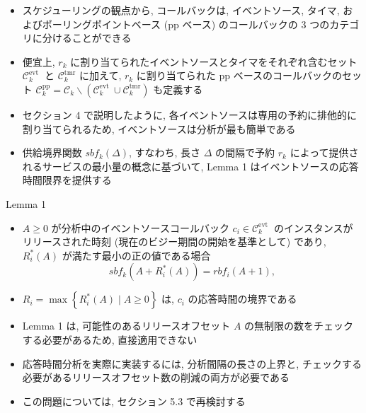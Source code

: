 \begin{frame}{}
    \begin{itemize}
        \item スケジューリングの観点から, コールバックは, イベントソース, タイマ, およびポーリングポイントベース (pp ベース) のコールバックの 3 つのカテゴリに分けることができる
\item 便宜上, $r_{k}$ に割り当てられたイベントソースとタイマをそれぞれ含むセット $\mathcal{C}_{k}^{\text {evt }}$ と $\mathcal{C}_{k}^{\mathrm{tmr}}$ に加えて, $r_{k}$ に割り当てられた pp ベースのコールバックのセット $\mathcal{C}_{k}^{\mathrm{pp}}=\mathcal{C}_{k} \backslash\left(\mathcal{C}_{k}^{\text {evt }} \cup \mathcal{C}_{k}^{\mathrm{tmr}}\right)$ も定義する
\item セクション 4 で説明したように, 各イベントソースは専用の予約に排他的に割り当てられるため, イベントソースは分析が最も簡単である
\item 供給境界関数 $s b f_{k}(\Delta)$, すなわち, 長さ $\Delta$ の間隔で予約 $r_{k}$ によって提供されるサービスの最小量の概念に基づいて, Lemma 1 はイベントソースの応答時間限界を提供する
    \end{itemize}
\end{frame}

\begin{frame}[label=lemma1]{Lemma 1}
    \begin{lemma}[]
        \begin{itemize}
            \item $A \geq 0$ が分析中のイベントソースコールバック $c_{i} \in \mathcal{C}_{k}^{\text {evt }}$ のインスタンスがリリースされた時刻 (現在のビジー期間の開始を基準として) であり, $R_{i}^{*}(A)$ が満たす最小の正の値である場合
                  \begin{equation*}
                      s b f_{k}\left(A+R_{i}^{*}(A)\right)=r b f_{i}(A+1),
                  \end{equation*}

            \item $R_{i}=\max \left\{R_{i}^{*}(A) \mid A \geq 0\right\}$ は, $c_{i}$ の応答時間の境界である
        \end{itemize}
    \end{lemma}
\end{frame}

\begin{frame}{}
    \begin{itemize}
        \item Lemma 1 は, 可能性のあるリリースオフセット $A$ の無制限の数をチェックする必要があるため, 直接適用できない
\item 応答時間分析を実際に実装するには, 分析間隔の長さの上界と, チェックする必要があるリリースオフセット数の削減の両方が必要である
\item この問題については, セクション 5.3 で再検討する
    \end{itemize}
\end{frame}

